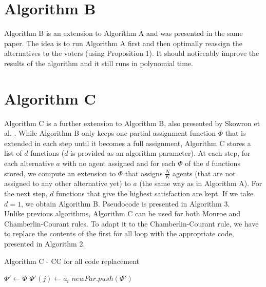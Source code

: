 \section{Algorithm B}

Algorithm B is an extension to Algorithm A and was presented in the same paper. The idea is to run Algorithm A first and then optimally reassign the alternatives to the voters (using Proposition 1). It should noticeably improve the results of the algorithm and it still runs in polynomial time.

\section{Algorithm C}

Algorithm C is a further extension to Algorithm B, also presented by Skowron et al. \cite{1}. While Algorithm B only keeps one partial assignment function $\Phi$ that is extended in each step until it becomes a full assignment, Algorithm C stores a list of $d$ functions ($d$ is provided as an algorithm parameter). At each step, for each alternative $a$ with no agent assigned and for each $\Phi$ of the $d$ functions stored, we compute an extension to $\Phi$ that assigns $\frac{N}{K}$ agents (that are not assigned to any other alternative yet) to $a$ (the same way as in Algorithm A). For the next step, $d$ functions that give the highest satisfaction are kept. If we take $d = 1$, we obtain Algorithm B. Pseudocode is presented in Algorithm 3.
\\

Unlike previous algorithms, Algorithm C can be used for both Monroe and Chamberlin-Courant rules. To adapt it to the Chamberlin-Courant rule, we have to replace the contents of the first for all loop with the appropriate code, presented in Algorithm 2.

\begin{algorithm}
\caption{Algorithm C - CC for all code replacement}\label{euclid}
\begin{algorithmic}[1]
		\State $\Phi' \gets \Phi$
				\State $\Phi'(j) \gets a_{i}$
			\EndIf
		\EndFor
		\State $newPar.push(\Phi')$
	\EndFor
\end{algorithmic}
\end{algorithm}


